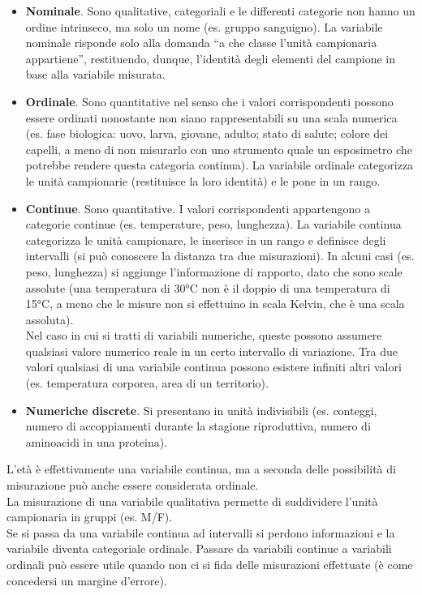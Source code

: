 \documentclass[10pt, draft]{book}
\newcommand{\tightlist}{%
\setlength{\itemsep}{1pt}\setlength{\parskip}{0pt}\setlength{\parsep}{0pt}}
\begin{document}
\begin{itemize} \tightlist
    \item \textbf{Nominale}. Sono qualitative, categoriali e le differenti categorie non hanno un ordine intrinseco, ma solo un nome (es. gruppo sanguigno). La variabile nominale risponde solo alla domanda “a che classe l'unità campionaria appartiene”, restituendo, dunque, l'identità degli elementi del campione in base alla variabile misurata.
    \item \textbf{Ordinale}. Sono quantitative nel senso che i valori corrispondenti possono essere ordinati nonostante non siano rappresentabili su una scala numerica (es. fase biologica: uovo, larva, giovane, adulto; stato di salute; colore dei capelli, a meno di non misurarlo con uno strumento quale un esposimetro che potrebbe rendere questa categoria continua). La variabile ordinale categorizza le unità campionarie (restituisce la loro identità) e le pone in un rango.
    \item \textbf{Continue}. Sono quantitative. I valori corrispondenti appartengono a categorie continue (es. temperature, peso, lunghezza). La variabile continua categorizza le unità campionare, le inserisce in un rango e definisce degli intervalli (si può conoscere la distanza tra due misurazioni). In alcuni casi (es. peso, lunghezza) si aggiunge l'informazione di rapporto, dato che sono scale assolute (una temperatura di 30°C non è il doppio di una temperatura di 15°C, a meno che le misure non si effettuino in scala Kelvin, che è una scala assoluta).
    \\
    Nel caso in cui si tratti di variabili numeriche, queste possono assumere qualsiasi valore numerico reale in un certo intervallo di variazione. Tra due valori qualsiasi di una variabile continua possono esistere infiniti altri valori (es. temperatura corporea, area di un territorio).
    \item \textbf{Numeriche discrete}. Si presentano in unità indivisibili (es. conteggi, numero di accoppiamenti durante la stagione riproduttiva, numero di aminoacidi in una proteina).
\end{itemize}
L'età è effettivamente una variabile continua, ma a seconda delle possibilità di misurazione può anche essere considerata ordinale.
\\
La misurazione di una variabile qualitativa permette di suddividere l'unità campionaria in gruppi (es. M/F).
\\
Se si passa da una variabile continua ad intervalli si perdono informazioni e la variabile diventa categoriale ordinale. Passare da variabili continue a variabili ordinali può essere utile quando non ci si fida delle misurazioni effettuate (è come concedersi un margine d'errore).
\end{document}
